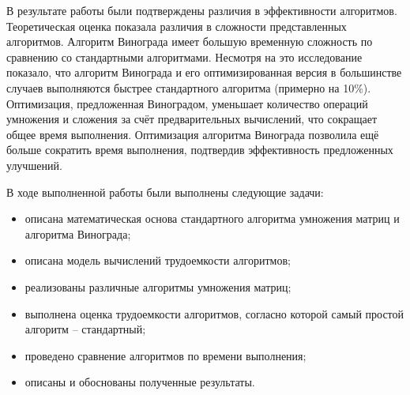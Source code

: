 
В результате работы были подтверждены различия в эффективности алгоритмов.
Теоретическая оценка показала различия в сложности представленных алгоритмов.
Алгоритм Винограда имеет большую временную сложность по сравнению со стандартными алгоритмами.
Несмотря на это исследование показало, что алгоритм Винограда и его оптимизированная версия в большинстве случаев выполняются быстрее стандартного алгоритма (примерно на 10\%).
Оптимизация, предложенная Виноградом, уменьшает количество операций умножения и сложения за счёт предварительных вычислений, что сокращает общее время выполнения.
Оптимизация алгоритма Винограда позволила ещё больше сократить время выполнения, подтвердив эффективность предложенных улучшений.

В ходе выполненной работы были выполнены следующие задачи:
\begin{itemize}
    \item описана математическая основа стандартного алгоритма умножения матриц и алгоритма Винограда;
	\item описана модель вычислений трудоемкости алгоритмов;
	\item реализованы различные алгоритмы умножения матриц;
	\item выполнена оценка трудоемкости алгоритмов, согласно которой самый простой алгоритм -- стандартный;
	\item проведено сравнение алгоритмов по времени выполнения;
	\item описаны и обоснованы полученные результаты.
\end{itemize}
